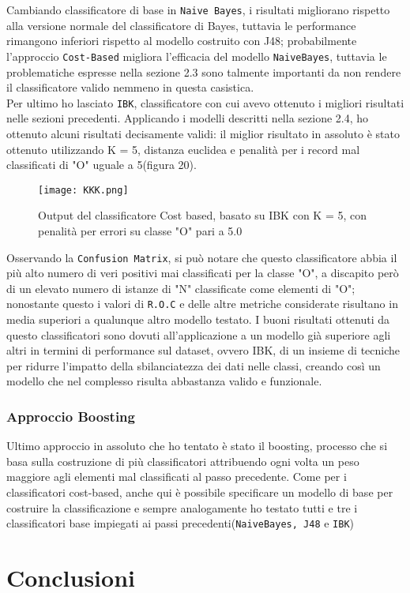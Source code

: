 Cambiando classificatore di base in \texttt{Naive Bayes}, i risultati migliorano rispetto alla versione normale del classificatore di Bayes, tuttavia le performance rimangono inferiori rispetto al modello costruito con J48; probabilmente l'approccio \texttt{Cost-Based} migliora l'efficacia del modello \texttt{NaiveBayes}, tuttavia le problematiche espresse nella sezione 2.3 sono talmente importanti da non rendere il classificatore valido nemmeno in questa casistica.\\
Per ultimo ho lasciato \texttt{IBK}, classificatore con cui avevo ottenuto i migliori risultati nelle sezioni precedenti. Applicando i modelli descritti nella sezione 2.4, ho ottenuto alcuni risultati decisamente validi: il miglior risultato in assoluto è stato ottenuto utilizzando K = 5, distanza euclidea e penalità per i record mal classificati di "O" uguale a 5(figura 20). 

\begin{figure}[H]
	\texttt{[image: KKK.png]}
	\caption{Output del classificatore Cost based, basato su IBK con K = 5, con penalità per errori su classe "O" pari a 5.0}
\end{figure} 

Osservando la \texttt{Confusion Matrix}, si può notare che questo classificatore abbia il più alto numero di veri positivi mai classificati per la classe "O", a discapito però di un elevato numero di istanze di "N" classificate come elementi di "O"; nonostante questo i valori di \texttt{R.O.C} e delle altre metriche considerate risultano in media superiori a qualunque altro modello testato. 
I buoni risultati ottenuti da questo classificatori sono dovuti all'applicazione a un modello già superiore agli altri in termini di performance sul dataset, ovvero IBK, di un insieme di tecniche per ridurre l'impatto della sbilanciatezza dei dati nelle classi, creando così un modello che nel complesso risulta abbastanza valido e funzionale.

  \subsubsection{Approccio Boosting}
Ultimo approccio in assoluto che ho tentato è stato il boosting, processo che si basa sulla costruzione di più classificatori attribuendo ogni volta un peso maggiore agli elementi mal classificati al passo precedente.
Come per i classificatori cost-based, anche qui è possibile specificare un modello di base per costruire la classificazione e sempre analogamente ho testato tutti e tre i classificatori base impiegati ai passi precedenti(\texttt{NaiveBayes, J48} e \texttt{IBK})  
  \section{Conclusioni}
  

